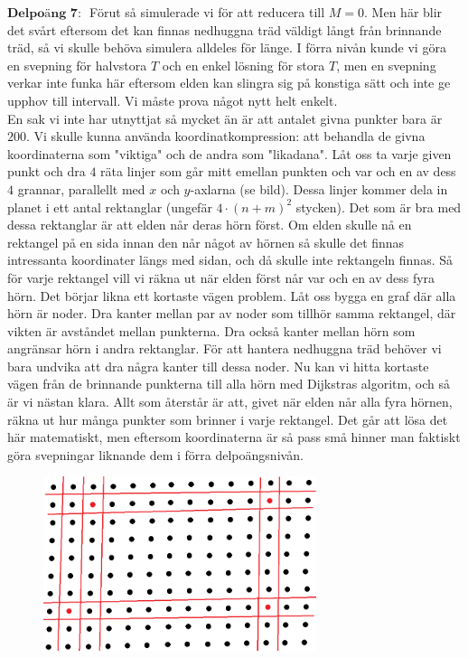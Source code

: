 $\textbf{Delpoäng 7: }$ Förut så simulerade vi för att reducera till $M = 0$. Men här blir det svårt eftersom det kan finnas nedhuggna träd väldigt långt från brinnande träd, så vi skulle behöva simulera alldeles för länge. I förra nivån kunde vi göra en svepning för halvstora $T$ och en enkel lösning för stora $T$, men en svepning verkar inte funka här eftersom elden kan slingra sig på konstiga sätt och inte ge upphov till intervall. Vi måste prova något nytt helt enkelt. \\
En sak vi inte har utnyttjat så mycket än är att antalet givna punkter bara är $200$. Vi skulle kunna använda koordinatkompression: att behandla de givna koordinaterna som "viktiga" och de andra som "likadana". Låt oss ta varje given punkt och dra $4$ räta linjer som går mitt emellan punkten och var och en av dess $4$ grannar, parallellt med $x$ och $y$-axlarna (se bild). Dessa linjer kommer dela in planet i ett antal rektanglar (ungefär $4\cdot (n+m)^2$ stycken). Det som är bra med dessa rektanglar är att elden når deras hörn först. Om elden skulle nå en rektangel på en sida innan den når något av hörnen så skulle det finnas intressanta koordinater längs med sidan, och då skulle inte rektangeln finnas. Så för varje rektangel vill vi räkna ut när elden först når var och en av dess fyra hörn. Det börjar likna ett kortaste vägen problem. Låt oss bygga en graf där alla hörn är noder. Dra kanter mellan par av noder som tillhör samma rektangel, där vikten är avståndet mellan punkterna. Dra också kanter mellan hörn som angränsar hörn i andra rektanglar. För att hantera nedhuggna träd behöver vi bara undvika att dra några kanter till dessa noder. Nu kan vi hitta kortaste vägen från de brinnande punkterna till alla hörn med Dijkstras algoritm, och så är vi nästan klara. Allt som återstår är att, givet när elden når alla fyra hörnen, räkna ut hur många punkter som brinner i varje rektangel. Det går att lösa det här matematiskt, men eftersom koordinaterna är så pass små hinner man faktiskt göra svepningar liknande dem i förra delpoängsnivån.

\begin{figure}[!h]
\begin{center}
\includegraphics[width=8cm]{skogsbrand_2.png}
\end{center}
\end{figure}


